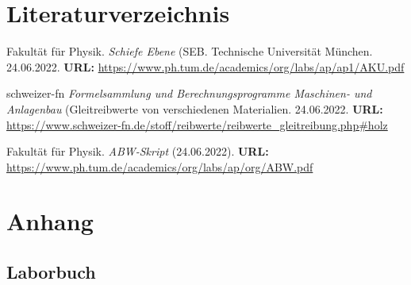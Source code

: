 \documentclass{article}
\begin{document}
\section{Literaturverzeichnis}
\begin{thebibliography}{9}
Fakultät für Physik. \emph{Schiefe Ebene} (SEB. Technische Universität München. 24.06.2022.
\textbf{URL:} \url{https://www.ph.tum.de/academics/org/labs/ap/ap1/AKU.pdf}

schweizer-fn \emph{Formelsammlung und Berechnungsprogramme Maschinen- und Anlagenbau} (Gleitreibwerte von verschiedenen Materialien. 24.06.2022.
\textbf{URL:} \url{https://www.schweizer-fn.de/stoff/reibwerte/reibwerte_gleitreibung.php#holz}

Fakultät für Physik. \emph{ABW-Skript} (24.06.2022).
\textbf{URL:} \url{https://www.ph.tum.de/academics/org/labs/ap/org/ABW.pdf}

\end{thebibliography}
\section{Anhang}
\subsection{Laborbuch}

\end{document}
